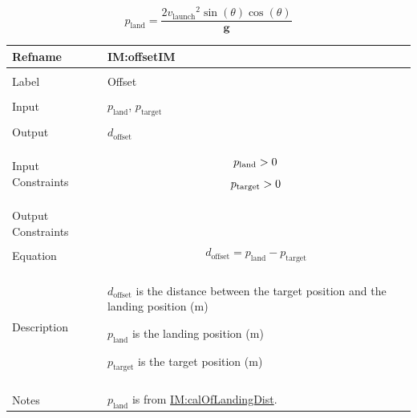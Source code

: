 \documentclass[12pt]{article}
\newcommand{\gt}{\ensuremath >}
\begin{document}
\begin{displaymath}
{p_{\text{land}}}=\frac{2 {v_{\text{launch}}}^{2} \sin\left(θ\right) \cos\left(θ\right)}{\symbf{g}}
\end{displaymath}
\vspace{\baselineskip}
\noindent
\begin{minipage}{\textwidth}
\begin{tabular}{>{\raggedright}p{}>{\raggedright\arraybackslash}p{}}
\toprule \textbf{Refname} & \textbf{IM:offsetIM}
\label{IM:offsetIM}
\\ \midrule \\
Label & Offset
        
\\ \midrule \\
Input & ${p_{\text{land}}}$, ${p_{\text{target}}}$
        
\\ \midrule \\
Output & ${d_{\text{offset}}}$
         
\\ \midrule \\
Input Constraints & \begin{displaymath}
                    {p_{\text{land}}}\gt{}0
                    \end{displaymath}
                    \begin{displaymath}
                    {p_{\text{target}}}\gt{}0
                    \end{displaymath}
\\ \midrule \\
Output Constraints & 
\\ \midrule \\
Equation & \begin{displaymath}
           {d_{\text{offset}}}={p_{\text{land}}}-{p_{\text{target}}}
           \end{displaymath}
\\ \midrule \\
Description & \begin{symbDescription}
              \item{${d_{\text{offset}}}$ is the distance between the target position and the landing position (${\text{m}}$)}
              \item{${p_{\text{land}}}$ is the landing position (${\text{m}}$)}
              \item{${p_{\text{target}}}$ is the target position (${\text{m}}$)}
              \end{symbDescription}
\\ \midrule \\
Notes & ${p_{\text{land}}}$ is from \hyperref[IM:calOfLandingDist]{IM:calOfLandingDist}.
        

\end{tabular}
\end{minipage}
\end{document}
